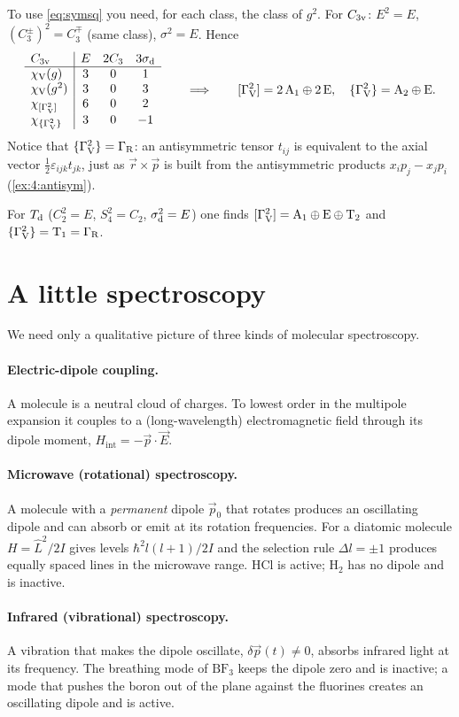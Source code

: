 To use \eqref{eq:symsq} you need, for each class, the class of $g^2$. For $C_{3\mathrm{v}}$:
$E^2=E$, $(C_3^{\pm})^2=C_3^{\mp}$ (same class), $\sigma^2=E$. Hence
\[
\begin{array}{l|ccc}
C_{3\mathrm{v}} & E & 2C_3 & 3\sigma_{\mathrm{d}}\\\hline
\chi_{\mathrm{V}}(g) & 3 & 0 & 1\\
\chi_{\mathrm{V}}(g^2) & 3 & 0 & 3\\
\chi_{[\Gamma_{\mathrm{V}}^2]} & 6 & 0 & 2\\
\chi_{\{\Gamma_{\mathrm{V}}^2\}} & 3 & 0 & -1
\end{array}
\qquad\Longrightarrow\qquad
[\Gamma_{\mathrm{V}}^2]=2\,\mathrm{A}_1\oplus2\,\mathrm{E},\quad \{\Gamma_{\mathrm{V}}^2\}=\mathrm{A}_2\oplus\mathrm{E}.
\]
Notice that $\{\Gamma_{\mathrm{V}}^2\}=\Gamma_{\mathrm{R}}$: an antisymmetric tensor $t_{ij}$ is equivalent to the
axial vector $\tfrac12\varepsilon_{ijk}t_{jk}$, just as $\vec{r}\times\vec{p}$ is built
from the antisymmetric products $x_ip_j-x_jp_i$ (\cref{ex:4:antisym}).

For $T_{\mathrm{d}}$ ($C_2^2=E$, $S_4^2=C_2$, $\sigma_{\mathrm{d}}^2=E$) one finds
$[\Gamma_{\mathrm{V}}^2]=\mathrm{A}_1\oplus\mathrm{E}\oplus\mathrm{T}_2$ and $\{\Gamma_{\mathrm{V}}^2\}=\mathrm{T}_1=\Gamma_{\mathrm{R}}$.

\section{A little spectroscopy}

We need only a qualitative picture of three kinds of molecular spectroscopy.

\paragraph{Electric-dipole coupling.} A molecule is a neutral cloud of charges. To
lowest order in the multipole expansion it couples to a (long-wavelength)
electromagnetic field through its dipole moment, $H_{\mathrm{int}}=-\vec{p}\cdot\vec{E}$.

\paragraph{Microwave (rotational) spectroscopy.} A molecule with a \emph{permanent}
dipole $\vec{p}_0$ that rotates produces an oscillating dipole and can absorb or emit
at its rotation frequencies. For a diatomic molecule $H=\hat{L}^2/2I$ gives levels
$\hbar^2l(l+1)/2I$ and the selection rule $\Delta l=\pm1$ produces equally spaced
lines in the microwave range. $\mathrm{HCl}$ is active; $\mathrm{H_2}$ has no
dipole and is inactive.

\paragraph{Infrared (vibrational) spectroscopy.} A vibration that makes the dipole
oscillate, $\delta\vec{p}(t)\neq0$, absorbs infrared light at its frequency. The
breathing mode of $\mathrm{BF_3}$ keeps the dipole zero and is inactive; a mode that
pushes the boron out of the plane against the fluorines creates an oscillating dipole
and is active.

